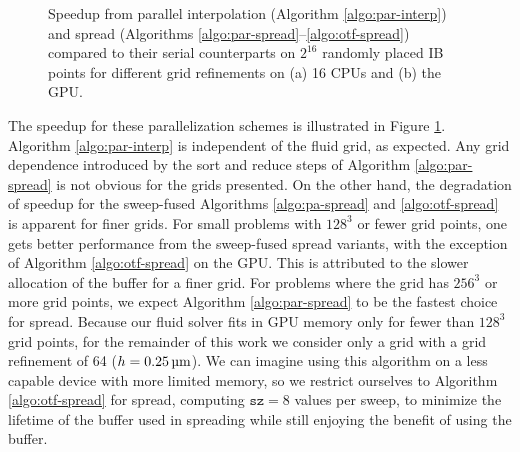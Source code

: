\begin{figure}[h]
\caption{%
    Speedup from parallel interpolation (Algorithm \ref{algo:par-interp})
    and spread (Algorithms \ref{algo:par-spread}--\ref{algo:otf-spread})
    compared to their serial counterparts on $2^{16}$ randomly placed IB points
    for different grid refinements on (a) 16 CPUs and (b) the GPU. 
}
\label{fig:grid-dependence}
\end{figure}

The speedup for these parallelization schemes is illustrated in Figure
\ref{fig:grid-dependence}. Algorithm \ref{algo:par-interp} is independent of
the fluid grid, as expected. Any grid dependence introduced by the sort and
reduce steps of Algorithm \ref{algo:par-spread} is not obvious for the grids
presented. On the other hand, the degradation of speedup for the sweep-fused
Algorithms \ref{algo:pa-spread} and \ref{algo:otf-spread} is apparent for finer
grids. For small problems with $128^3$ or fewer grid points, one gets better
performance from the sweep-fused spread variants, with the exception of
Algorithm \ref{algo:otf-spread} on the GPU. This is attributed to the slower
allocation of the buffer for a finer grid. For problems where the grid has
$256^3$ or more grid points, we expect Algorithm \ref{algo:par-spread} to be
the fastest choice for spread. Because our fluid solver fits in GPU memory only
for fewer than $128^3$ grid points, for the remainder of this work we consider
only a grid with a grid refinement of 64 ($h = 0.25\um$). We can imagine using
this algorithm on a less capable device with more limited memory, so we
restrict ourselves to Algorithm \ref{algo:otf-spread} for spread, computing
$\texttt{sz}=8$ values per sweep, to minimize the lifetime of the buffer used
in spreading while still enjoying the benefit of using the buffer.
